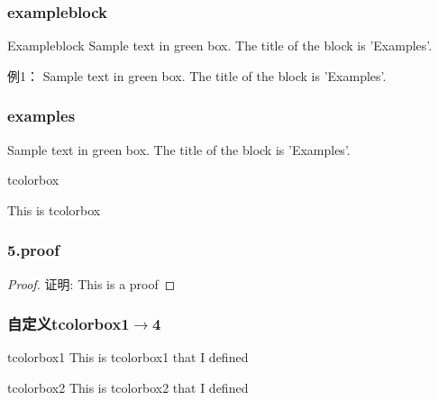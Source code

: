 \begin{frame}
    \frametitle{exampleblock}
	\begin{exampleblock} {Exampleblock}
		Sample text in green box. The title of the block is 'Examples'.
	\end{exampleblock}
    \begin{exampleblock} {例1：}
		Sample text in green box. The title of the block is 'Examples'.
	\end{exampleblock}
\end{frame}

\begin{frame}
    \frametitle{examples}
	\begin{examples}
		Sample text in green box. The title of the block is 'Examples'.
	\end{examples}
\end{frame}

\begin{frame}{tcolorbox}  
  \begin{tcolorbox}[title=5.tcolorbox,colframe=red!75!black]
    This is tcolorbox
  \end{tcolorbox}
\end{frame}

\begin{frame}
    \frametitle{5.proof}
    \begin{proof}{证明:}
      {This is a proof}
    \end{proof}
\end{frame}

\begin{frame}
    \frametitle{自定义tcolorbox1$\to$4}
    \begin{tcolorbox1}[0.8]{tcolorbox1}
      This is tcolorbox1 that I defined
    \end{tcolorbox1}
    \begin{tcolorbox2}[0.86]{tcolorbox2}
      This is tcolorbox2 that I defined
    \end{tcolorbox2}
\end{frame}
\begin{frame}
  \frametitle{}
  \begin{tcolorbox3}[量子力学基本假设1/5]
    \lipsum[4]
  \end{tcolorbox3}
\end{frame}

\begin{frame}    
    \begin{tcolorbox4}[量子力学基本假设1/5]
    \lipsum[4]
    \end{tcolorbox4}
\end{frame}

